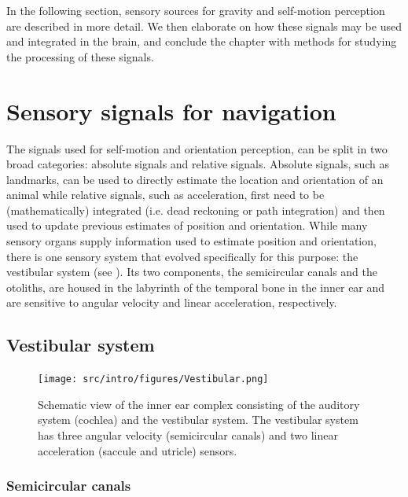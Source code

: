 In the following section, sensory sources for gravity and self-motion perception are described in more detail. We then elaborate on how these signals may be used and integrated in the brain, and conclude the chapter with methods for studying the processing of these signals. 
 


\section{Sensory signals for navigation}

The signals used for self-motion and orientation perception, can be split in two broad categories: absolute signals and relative signals. Absolute signals, such as landmarks, can be used to directly estimate the location and orientation of an animal while relative signals, such as acceleration, first need to be (mathematically) integrated (i.e. dead reckoning or path integration) and then used to update previous estimates of position and orientation. While many sensory organs supply information used to estimate position and orientation, there is one sensory system that evolved specifically for this purpose: the vestibular system (see ). Its two components, the semicircular canals and the otoliths, are housed in the labyrinth of the temporal bone in the inner ear and are sensitive to angular velocity and linear acceleration, respectively.


\subsection{Vestibular system}

\begin{figure}
    \texttt{[image: src/intro/figures/Vestibular.png]}
    \caption{Schematic view of the inner ear complex consisting of the auditory system (cochlea) and the vestibular system. The vestibular system has three angular velocity (semicircular canals) and two linear acceleration (saccule and utricle) sensors.}
    \label{intro:fig6}
\end{figure}


\subsubsection{Semicircular canals}

